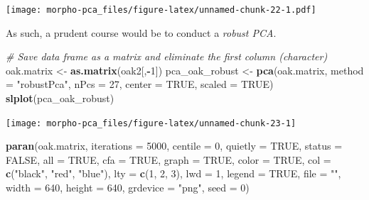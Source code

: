 \documentclass[]{article}
\newenvironment{Shaded}{\begin{snugshade}}{\end{snugshade}}
\newcommand{\CommentTok}[1]{\textcolor[rgb]{0.56,0.35,0.01}{\textit{#1}}}
\newcommand{\DataTypeTok}[1]{\textcolor[rgb]{0.13,0.29,0.53}{#1}}
\newcommand{\DecValTok}[1]{\textcolor[rgb]{0.00,0.00,0.81}{#1}}
\newcommand{\KeywordTok}[1]{\textcolor[rgb]{0.13,0.29,0.53}{\textbf{#1}}}
\newcommand{\NormalTok}[1]{#1}
\newcommand{\OperatorTok}[1]{\textcolor[rgb]{0.81,0.36,0.00}{\textbf{#1}}}
\newcommand{\OtherTok}[1]{\textcolor[rgb]{0.56,0.35,0.01}{#1}}
\newcommand{\StringTok}[1]{\textcolor[rgb]{0.31,0.60,0.02}{#1}}
\begin{document}
\texttt{[image: morpho-pca\_files/figure-latex/unnamed-chunk-22-1.pdf]}

As such, a prudent course would be to conduct a \emph{robust PCA}.

\begin{Shaded}
\begin{Highlighting}[]
\CommentTok{# Save data frame as a matrix and eliminate the first column (character)}
\NormalTok{oak.matrix <-}\StringTok{ }\KeywordTok{as.matrix}\NormalTok{(oak2[,}\OperatorTok{-}\DecValTok{1}\NormalTok{])}
\NormalTok{pca_oak_robust <-}\StringTok{ }\KeywordTok{pca}\NormalTok{(oak.matrix, }\DataTypeTok{method =} \StringTok{"robustPca"}\NormalTok{, }\DataTypeTok{nPcs =} \DecValTok{27}\NormalTok{,}
                      \DataTypeTok{center =} \OtherTok{TRUE}\NormalTok{, }\DataTypeTok{scaled =} \OtherTok{TRUE}\NormalTok{)}
\KeywordTok{slplot}\NormalTok{(pca_oak_robust)}
\end{Highlighting}
\end{Shaded}

\begin{center}\texttt{[image: morpho-pca\_files/figure-latex/unnamed-chunk-23-1]} \end{center}

\begin{Shaded}
\begin{Highlighting}[]
\KeywordTok{paran}\NormalTok{(oak.matrix, }\DataTypeTok{iterations =} \DecValTok{5000}\NormalTok{, }\DataTypeTok{centile =} \DecValTok{0}\NormalTok{, }\DataTypeTok{quietly =} \OtherTok{TRUE}\NormalTok{, }
    \DataTypeTok{status =} \OtherTok{FALSE}\NormalTok{, }\DataTypeTok{all =} \OtherTok{TRUE}\NormalTok{, }\DataTypeTok{cfa =} \OtherTok{TRUE}\NormalTok{, }\DataTypeTok{graph =} \OtherTok{TRUE}\NormalTok{, }\DataTypeTok{color =} \OtherTok{TRUE}\NormalTok{, }
    \DataTypeTok{col =} \KeywordTok{c}\NormalTok{(}\StringTok{"black"}\NormalTok{, }\StringTok{"red"}\NormalTok{, }\StringTok{"blue"}\NormalTok{), }\DataTypeTok{lty =} \KeywordTok{c}\NormalTok{(}\DecValTok{1}\NormalTok{, }\DecValTok{2}\NormalTok{, }\DecValTok{3}\NormalTok{), }\DataTypeTok{lwd =} \DecValTok{1}\NormalTok{, }\DataTypeTok{legend =} \OtherTok{TRUE}\NormalTok{, }
    \DataTypeTok{file =} \StringTok{""}\NormalTok{, }\DataTypeTok{width =} \DecValTok{640}\NormalTok{, }\DataTypeTok{height =} \DecValTok{640}\NormalTok{, }\DataTypeTok{grdevice =} \StringTok{"png"}\NormalTok{, }\DataTypeTok{seed =} \DecValTok{0}\NormalTok{)}
\end{Highlighting}
\end{Shaded}
\end{document}
